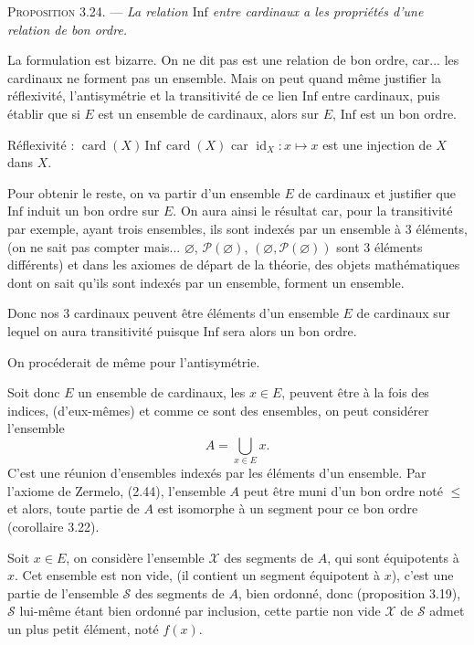 \medskip\noindent\textsc{Proposition 3.24.} --- \emph{La relation $\mathrm{Inf}$ entre cardinaux a les propriétés d'une relation de bon ordre.}

La formulation est bizarre. On ne dit pas est une relation de bon ordre, car... les cardinaux ne forment pas un ensemble. Mais on peut quand même justifier la réflexivité, l'antisymétrie et la transitivité de ce lien $\mathrm{Inf}$ entre cardinaux, puis établir que si $E$ est un ensemble de cardinaux, alors sur $E$, $\mathrm{Inf}$ est un bon ordre.

Réflexivité : $\operatorname{card}(X)\,\mathrm{Inf}\,\operatorname{card}(X)$ car $\operatorname{id}_X:x\mapsto x$ est une injection de $X$ dans $X$.

Pour obtenir le reste, on va partir d'un ensemble $E$ de cardinaux et justifier que $\mathrm{Inf}$ induit un bon ordre sur $E$. On aura ainsi le résultat car, pour la transitivité par exemple, ayant trois ensembles, ils sont indexés par un ensemble à 3 éléments, (on ne sait pas compter mais... $\varnothing$, $\mathcal P(\varnothing)$, $(\varnothing,\mathcal P(\varnothing))$ sont 3 éléments différents) et dans les axiomes de départ de la théorie, des objets mathématiques dont on sait qu'ils sont indexés par un ensemble, forment un ensemble.

Donc nos 3 cardinaux peuvent être éléments d'un ensemble $E$ de cardinaux sur lequel on aura transitivité puisque $\mathrm{Inf}$ sera alors un bon ordre.

On procéderait de même pour l'antisymétrie.

Soit donc $E$ un ensemble de cardinaux, les $x\in E$, peuvent être à la fois des indices, (d'eux-mêmes) et comme ce sont des ensembles, on peut considérer l'ensemble
\[
A=\bigcup_{x\in E}x.
\]
C'est une réunion d'ensembles indexés par les éléments d'un ensemble. Par l'axiome de Zermelo, (2.44), l'ensemble $A$ peut être muni d'un bon ordre noté $\le$ et alors, toute partie de $A$ est isomorphe à un segment pour ce bon ordre (corollaire 3.22). 

Soit $x\in E$, on considère l'ensemble $\mathcal X$ des segments de $A$, qui sont équipotents à $x$. Cet ensemble est non vide, (il contient un segment équipotent à $x$), c'est une partie de l'ensemble $\mathcal S$ des segments de $A$, bien ordonné, donc (proposition 3.19), $\mathcal S$ lui-même étant bien ordonné par inclusion, cette partie non vide $\mathcal X$ de $\mathcal S$ admet un plus petit élément, noté $f(x)$.


